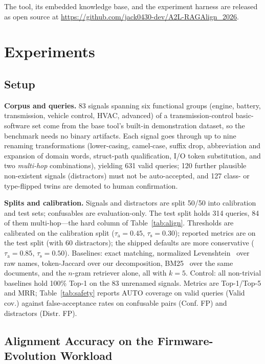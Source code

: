 \documentclass[conference]{IEEEtran}
\begin{document}
The tool, its embedded knowledge base, and the experiment harness are released
as open source at \url{https://github.com/jack0430-dev/A2L-RAGAlign_2026}.

\section{Experiments}
\label{sec:experiments}

\subsection{Setup}
\label{sec:setup}
\textbf{Corpus and queries.} 83 signals spanning six functional groups
(engine, battery, transmission, vehicle control, HVAC, advanced) of a
transmission-control basic-software set come from the base tool's built-in
demonstration dataset, so the benchmark needs no binary artifacts. Each signal
goes through up to nine renaming transformations (lower-casing, camel-case,
suffix drop, abbreviation and expansion of domain words, struct-path
qualification, I/O token substitution, and two \emph{multi-hop} combinations),
yielding 631 valid queries; 120 further plausible non-existent signals
(distractors) must not be auto-accepted, and 127 class- or type-flipped twins
are demoted to human confirmation.

\textbf{Splits and calibration.} Signals and distractors are split 50/50 into
calibration and test sets; confusables are evaluation-only. The test split
holds 314 queries, 84 of them multi-hop---the hard column of
Table~\ref{tab:align}. Thresholds are calibrated on the calibration split
($\tau_{\mathrm{a}}{=}0.45$, $\tau_{\mathrm{s}}{=}0.30$); reported metrics are
on the test split (with 60 distractors); the shipped defaults are more
conservative ($\tau_{\mathrm{a}}{=}0.85$, $\tau_{\mathrm{s}}{=}0.50$).
Baselines: exact matching, normalized Levenshtein~\cite{levenshtein1966} over
raw names, token-Jaccard over our decomposition, BM25~\cite{robertson2009bm25}
over the same documents, and the $n$-gram retriever alone, all with $k{=}5$.
Control: all non-trivial baselines hold 100\% Top-1 on the 83 unrenamed
signals. Metrics are Top-1/Top-5 and MRR; Table~\ref{tab:safety} reports AUTO
coverage on valid queries (Valid cov.) against false-acceptance rates on
confusable pairs (Conf. FP) and distractors (Distr. FP).

\subsection{Alignment Accuracy on the Firmware-Evolution Workload}
\label{sec:accuracy}

\end{document}
